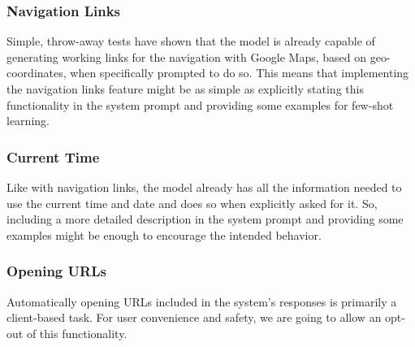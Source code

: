 \documentclass{article}
\begin{document}
\subsubsection{Navigation Links}
Simple, throw-away tests have shown that the model is already capable of generating working links for the navigation with Google Maps, based on geo-coordinates, when specifically prompted to do so. This means that implementing the navigation links feature might be as simple as explicitly stating this functionality in the system prompt and providing some examples for few-shot learning.

\subsubsection{Current Time}
Like with navigation links, the model already has all the information needed to use the current time and date and does so when explicitly asked for it. So, including a more detailed description in the system prompt and providing some examples might be enough to encourage the intended behavior.

\subsubsection{Opening URLs}
Automatically opening URLs included in the system's responses is primarily a client-based task. For user convenience and safety, we are going to allow an opt-out of this functionality.
\end{document}
